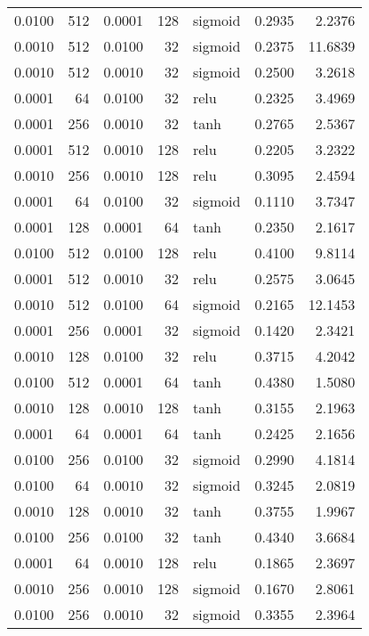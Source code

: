\begin{table}
\begin{tabular}{rrrrlrr}
0.0100 & 512 & 0.0001 & 128 & sigmoid & 0.2935 & 2.2376 \\
0.0010 & 512 & 0.0100 & 32 & sigmoid & 0.2375 & 11.6839 \\
0.0010 & 512 & 0.0010 & 32 & sigmoid & 0.2500 & 3.2618 \\
0.0001 & 64 & 0.0100 & 32 & relu & 0.2325 & 3.4969 \\
0.0001 & 256 & 0.0010 & 32 & tanh & 0.2765 & 2.5367 \\
0.0001 & 512 & 0.0010 & 128 & relu & 0.2205 & 3.2322 \\
0.0010 & 256 & 0.0010 & 128 & relu & 0.3095 & 2.4594 \\
0.0001 & 64 & 0.0100 & 32 & sigmoid & 0.1110 & 3.7347 \\
0.0001 & 128 & 0.0001 & 64 & tanh & 0.2350 & 2.1617 \\
0.0100 & 512 & 0.0100 & 128 & relu & 0.4100 & 9.8114 \\
0.0001 & 512 & 0.0010 & 32 & relu & 0.2575 & 3.0645 \\
0.0010 & 512 & 0.0100 & 64 & sigmoid & 0.2165 & 12.1453 \\
0.0001 & 256 & 0.0001 & 32 & sigmoid & 0.1420 & 2.3421 \\
0.0010 & 128 & 0.0100 & 32 & relu & 0.3715 & 4.2042 \\
0.0100 & 512 & 0.0001 & 64 & tanh & 0.4380 & 1.5080 \\
0.0010 & 128 & 0.0010 & 128 & tanh & 0.3155 & 2.1963 \\
0.0001 & 64 & 0.0001 & 64 & tanh & 0.2425 & 2.1656 \\
0.0100 & 256 & 0.0100 & 32 & sigmoid & 0.2990 & 4.1814 \\
0.0100 & 64 & 0.0010 & 32 & sigmoid & 0.3245 & 2.0819 \\
0.0010 & 128 & 0.0010 & 32 & tanh & 0.3755 & 1.9967 \\
0.0100 & 256 & 0.0100 & 32 & tanh & 0.4340 & 3.6684 \\
0.0001 & 64 & 0.0010 & 128 & relu & 0.1865 & 2.3697 \\
0.0010 & 256 & 0.0010 & 128 & sigmoid & 0.1670 & 2.8061 \\
0.0100 & 256 & 0.0010 & 32 & sigmoid & 0.3355 & 2.3964 \\
\bottomrule
\end{tabular}
\end{table}
